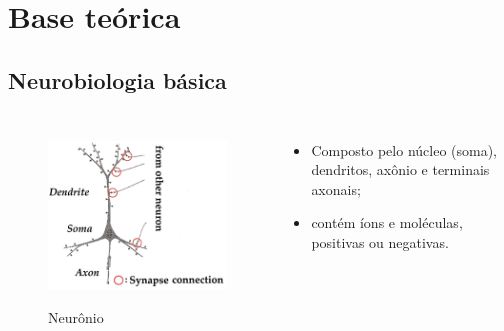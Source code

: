 \section{Base teórica}
\subsection*{Neurobiologia básica}
\begin{frame}
	\begin{columns}[t]
		\column{5cm}
			\begin{figure}[tb]
				\centering
				\caption{Neurônio}
				\includegraphics[width=0.55\linewidth]{figs/neuronio}
				\label{fig:neuronio}
			\end{figure}
		\column{5cm}
			\begin{itemize}
				\item Composto pelo núcleo (soma), dendritos, axônio e terminais axonais;
				\item contém íons e moléculas, positivas ou negativas.
			\end{itemize}
	\end{columns}
\end{frame}

